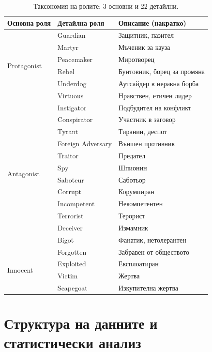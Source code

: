 \documentclass[12pt,a4paper]{report}
\begin{document}
\begin{table}[H]
\centering
\caption{Таксономия на ролите: 3 основни и 22 детайлни.}
\label{tab:taxonomy}
\small
\begin{tabular}{lll}
\toprule
\textbf{Основна роля} & \textbf{Детайлна роля} & \textbf{Описание (накратко)} \\
\midrule
\multirow{6}{*}{Protagonist}
  & Guardian      & Защитник, пазител \\
  & Martyr        & Мъченик за кауза \\
  & Peacemaker    & Миротворец \\
  & Rebel         & Бунтовник, борец за промяна \\
  & Underdog      & Аутсайдер в неравна борба \\
  & Virtuous      & Нравствен, етичен лидер \\
\midrule
\multirow{12}{*}{Antagonist}
  & Instigator    & Подбудител на конфликт \\
  & Conspirator   & Участник в заговор \\
  & Tyrant        & Тиранин, деспот \\
  & Foreign Adversary & Външен противник \\
  & Traitor       & Предател \\
  & Spy           & Шпионин \\
  & Saboteur      & Саботьор \\
  & Corrupt       & Корумпиран \\
  & Incompetent   & Некомпетентен \\
  & Terrorist     & Терорист \\
  & Deceiver      & Измамник \\
  & Bigot         & Фанатик, нетолерантен \\
\midrule
\multirow{4}{*}{Innocent}
  & Forgotten     & Забравен от обществото \\
  & Exploited     & Експлоатиран \\
  & Victim        & Жертва \\
  & Scapegoat     & Изкупителна жертва \\
\bottomrule
\end{tabular}
\end{table}


\section{Структура на данните и статистически анализ}
\end{document}
